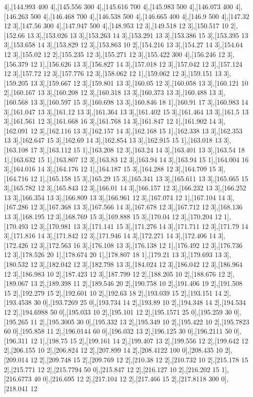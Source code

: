 {4],[144.993 400 4],[145.556 300 4],[145.616 700 4],[145.983 500 4],[146.073 400 4],[146.263 500 4],[146.468 700 4],[146.538 500 4],[146.665 400 4],[146.9 500 4],[147.32 12 3],[147.56 300 4],[147.947 500 4],[148.953 12 3],[149.518 12 3],[150.517 10 2],[152.66 13 3],[153.026 13 3],[153.263 14 3],[153.291 13 3],[153.386 15 3],[153.395 13 3],[153.658 14 3],[153.829 12 3],[153.863 10 2],[154.216 13 3],[154.27 14 3],[154.64 12 3],[155.02 12 2],[155.235 12 3],[155.271 12 3],[155.422 300 4],[156.246 12 3],[156.379 12 1],[156.626 13 3],[156.827 14 3],[157.018 12 3],[157.042 12 3],[157.124 12 3],[157.72 12 3],[157.776 12 3],[158.062 12 1],[159.062 12 3],[159.151 13 3],[159.205 13 3],[159.667 12 3],[159.801 13 3],[160.05 12 3],[160.058 13 3],[160.121 10 2],[160.167 13 3],[160.208 12 3],[160.318 13 3],[160.373 13 3],[160.488 13 3],[160.568 13 3],[160.597 15 3],[160.698 13 3],[160.846 18 1],[160.91 17 3],[160.983 14 3],[161.047 13 3],[161.12 13 3],[161.364 13 3],[161.402 15 3],[161.464 13 3],[161.5 13 3],[161.561 12 3],[161.668 16 3],[161.768 14 3],[161.847 12 1],[161.902 14 3],[162.091 12 3],[162.116 13 3],[162.157 14 3],[162.168 15 1],[162.338 13 3],[162.353 13 3],[162.647 15 3],[162.69 14 3],[162.854 13 3],[162.915 15 1],[163.018 13 3],[163.108 17 3],[163.112 15 1],[163.208 12 3],[163.24 14 3],[163.401 13 3],[163.54 18 1],[163.632 15 1],[163.807 12 3],[163.83 12 3],[163.94 14 3],[163.94 15 1],[164.004 16 3],[164.016 14 3],[164.176 12 1],[164.187 15 3],[164.288 12 3],[164.709 15 3],[164.716 12 1],[165.158 15 3],[165.29 15 3],[165.341 13 3],[165.611 13 3],[165.665 15 3],[165.782 12 3],[165.843 12 3],[166.01 14 3],[166.157 12 3],[166.232 13 3],[166.252 13 3],[166.354 13 3],[166.809 13 3],[166.961 12 3],[167.074 12 1],[167.104 14 3],[167.286 12 3],[167.368 13 3],[167.566 14 3],[167.678 12 3],[167.712 12 3],[168.136 13 3],[168.195 12 3],[168.769 15 3],[169.888 15 3],[170.04 12 3],[170.204 12 1],[170.493 12 3],[170.981 13 3],[171.141 15 3],[171.276 14 3],[171.711 12 3],[171.79 14 3],[171.816 14 3],[171.842 12 3],[171.946 14 3],[172.271 14 3],[172.406 14 3],[172.426 12 3],[172.563 16 3],[176.108 13 3],[176.138 12 1],[176.492 12 3],[176.736 12 3],[178.526 20 1],[178.674 20 1],[178.807 18 1],[179.21 13 3],[179.693 13 3],[180.532 12 3],[182.042 12 3],[182.798 13 3],[184.024 12 3],[186.042 12 3],[186.964 12 3],[186.983 10 2],[187.423 12 3],[187.799 12 2],[188.205 10 2],[188.676 12 2],[189.067 13 2],[189.398 11 2],[189.546 20 2],[190.758 10 2],[191.406 19 2],[191.508 15 2],[192.279 15 2],[192.601 10 2],[192.63 18 2],[193.039 15 2],[193.151 14 2],[193.4538 30 0],[193.7269 25 0],[193.734 14 2],[193.89 10 2],[194.348 14 2],[194.534 12 2],[194.6988 50 0],[195.033 10 2],[195.101 12 2],[195.1571 25 0],[195.259 30 0],[195.265 11 2],[195.3005 30 0],[195.332 13 2],[195.349 10 2],[195.422 10 2],[195.7823 60 0],[195.858 11 2],[196.0144 60 0],[196.032 13 2],[196.125 30 0],[196.2111 50 0],[196.311 12 1],[198.75 15 2],[199.161 14 2],[199.407 13 2],[199.556 12 2],[199.642 12 2],[206.155 10 2],[206.824 12 2],[207.899 14 2],[208.4122 100 0],[208.435 10 2],[209.014 12 2],[209.748 15 2],[209.769 12 2],[210.38 12 2],[210.732 10 2],[215.178 15 2],[215.771 12 2],[215.7794 50 0],[215.847 12 2],[216.127 10 2],[216.202 15 1],[216.6773 40 0],[216.695 12 2],[217.104 12 2],[217.466 15 2],[217.8118 300 0],[218.041 12 }
